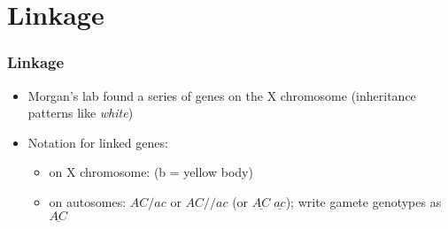 \section{Linkage}

\begin{frame}[t]
    \frametitle{Linkage}
    \begin{itemize}
        \item Morgan's lab found a series of genes on the X chromosome
            (inheritance patterns like \textit{white})

        \item Notation for linked genes:

            \begin{itemize}
                \item on X chromosome:  (b = yellow body)

                \item on autosomes: $AC/ac$ or $AC//ac$ (or $\underline{AC} \;
                    \underline{ac}$); write gamete genotypes as
                    $\underline{AC}$
            \end{itemize}
    \end{itemize}
\end{frame}




\begin{frame}
    \begin{clickerquestion}
        \item 
        \begin{clickeroptions}
            \item 
            \item 
            \item 
            \item 
        \end{clickeroptions}
    \end{clickerquestion}
\end{frame}
